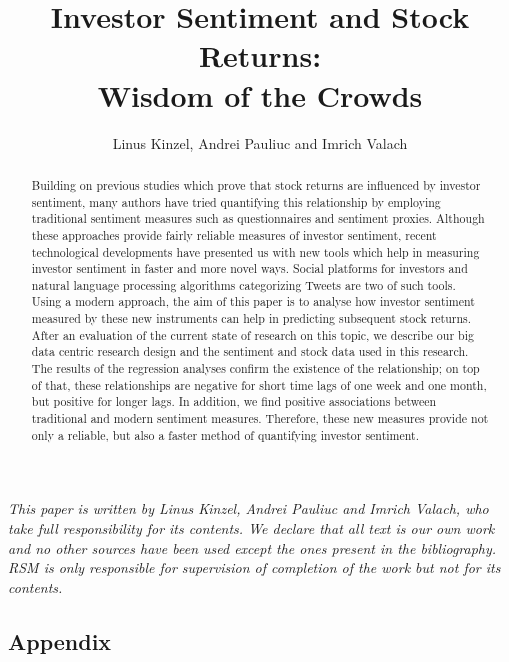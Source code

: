 \documentclass[a4paper]{article}
\title{%
 Investor Sentiment and Stock Returns: \\
Wisdom of the Crowds }
\author{Linus Kinzel, Andrei Pauliuc and Imrich Valach}
\newcommand{\invisiblesection}[1]{%
	\markright{#1}}
\begin{document}
\maketitle

\vspace{30mm}
\begin{abstract}
\noindent Building on previous studies which prove that stock returns are influenced by investor sentiment, many authors have tried quantifying this relationship by employing traditional sentiment measures such as questionnaires and sentiment proxies. Although these approaches provide fairly reliable measures of investor sentiment, recent technological developments have presented us with new tools which help in measuring investor sentiment in faster and more novel ways. Social platforms for investors and natural language processing algorithms categorizing Tweets are two of such tools. Using a modern approach, the aim of this paper is to analyse how investor sentiment measured by these new instruments can help in predicting subsequent stock returns. After an evaluation of the current state of research on this topic, we describe our big data centric research design and the sentiment and stock data used in this research. The results of the regression analyses confirm the existence of the relationship; on top of that, these relationships are negative for short time lags of one week and one month, but positive for longer lags. In addition, we find positive associations between traditional and modern sentiment measures. Therefore, these new measures provide not only a reliable, but also a faster method of quantifying investor sentiment.
\end{abstract}

\vspace{70mm}
\invisiblesection{disclaimer}
\textit{This paper is written by Linus Kinzel, Andrei Pauliuc and Imrich Valach, who take full responsibility for its contents. We declare that all text is our own work and no other sources have been used except the ones present in the bibliography. RSM is only responsible for supervision of completion of the work but not for its contents.}

\newpage
{\parskip=0pt
\tableofcontents
}




















\begin{landscape}
\newpage
\section{Appendix}





\end{landscape}
\end{document}
